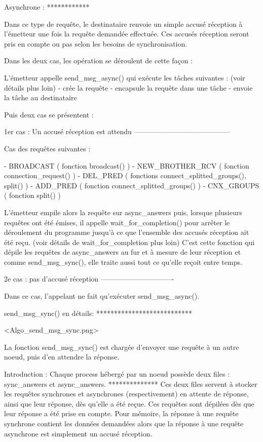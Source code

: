 Asynchrone :
************

Dans ce type de requête, le destinataire renvoie un simple accusé réception à l'émetteur une fois la
requête demandée effectuée. Ces accusés réception seront pris en compte ou pas selon les besoins de
synchronisation.

Dans les deux cas, les opération se déroulent de cette façon :

L'émetteur appelle send_msg_async() qui exécute les tâches suivantes : (voir détails plus loin)
- crée la requête
- encapsule la requête dans une tâche
- envoie la tâche au destinataire

Puis deux cas se présentent :

1er cas : Un accusé réception est attendu
-----------------------------------------

Cas des requêtes suivantes :

- BROADCAST ( fonction broadcast() )
- NEW_BROTHER_RCV ( fonction connection_request() )
- DEL_PRED ( fonctions connect_splitted_groups(), split() )
- ADD_PRED ( fonction connect_splitted_groups() )
- CNX_GROUPS ( fonction split() )

L'émetteur empile alors la requête sur async_answers puis, lorsque plusieurs requêtes ont été émises,
il appelle wait_for_completion() pour arrêter le déroulement du programme jusqu'à ce que l'ensemble
des accusés réception ait été reçu. (voir détails de wait_for_completion plus loin)
C'est cette fonction qui dépile les requêtes de async_answers au fur et à mesure de leur réception
et comme send_msg_sync(), elle traite aussi tout ce qu'elle reçoit entre temps.


2e cas : pas d'accusé réception
-------------------------------

Dans ce cas, l'appelant ne fait qu'exécuter send_msg_async().


send_msg_sync() en détails:
***************************

<Algo_send_msg_sync.png>

La fonction send_msg_sync() est chargée d'envoyer une requête à un autre noeud, puis d'en attendre
la réponse.

Introduction : Chaque process hébergé par un noeud possède deux files : sync_answers et async_answers.
**************
Ces deux files servent à stocker les requêtes synchrones et asynchrones (respectivement) en attente
de réponse, ainsi que leur réponse, dès qu'elle a été reçue. Ces requêtes sont dépilées dès que leur
réponse a été prise en compte.
Pour mémoire, la réponse à une requête synchrone contient les données demandées alors que la réponse
à une requête asynchrone est simplement un accusé réception.

